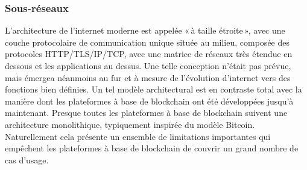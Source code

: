 \documentclass[runningheads,francais,a4paper]{llncs}
\begin{document}
\subsubsection{Sous-réseaux}
L'architecture de l'internet moderne est appelée «\,à taille étroite\,», avec une couche
protocolaire de communication unique située au milieu, composée des protocoles HTTP/TLS/IP/TCP, avec une matrice de
réseaux très étendue en dessous et les applications au dessus. Une telle conception n'était pas prévue, mais émergea
néanmoins au fur et à mesure de l'évolution d'internet vers des fonctions bien définies. Un tel modèle architectural
est en contraste total avec la manière dont les plateformes à base de blockchain ont été développées jusqu'à
maintenant. Presque toutes les plateformes à base de blockchain suivent une architecture monolithique, typiquement
inspirée du modèle Bitcoin. Naturellement cela présente un ensemble de limitations importantes qui empêchent les
plateformes à base de blockchain de couvrir un grand nombre de cas d'usage.
\end{document}
